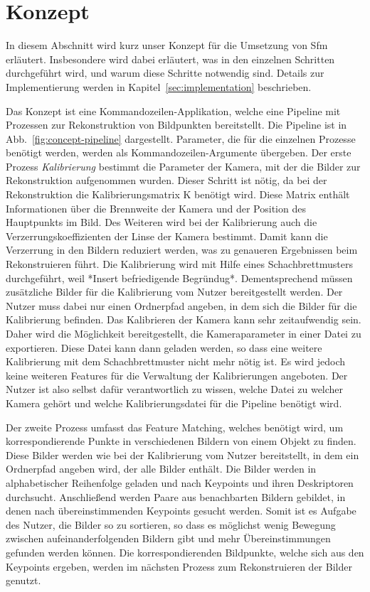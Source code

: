 
\chapter{Konzept}
In diesem Abschnitt wird kurz unser Konzept für die Umsetzung von Sfm erläutert. 
Insbesondere wird dabei erläutert, was in den einzelnen Schritten durchgeführt wird, und warum diese Schritte notwendig sind.
Details zur Implementierung werden in Kapitel~\ref{sec:implementation} beschrieben.

Das Konzept ist eine Kommandozeilen-Applikation, welche eine Pipeline mit Prozessen zur Rekonstruktion von Bildpunkten bereitstellt.
Die Pipeline ist in Abb.~\ref{fig:concept-pipeline} dargestellt.
Parameter, die für die einzelnen Prozesse benötigt werden, werden als Kommandozeilen-Argumente übergeben.
Der erste Prozess \emph{Kalibrierung} bestimmt die Parameter der Kamera, mit der die Bilder zur Rekonstruktion aufgenommen wurden.
Dieser Schritt ist nötig, da bei der Rekonstruktion die Kalibrierungsmatrix K benötigt wird.
Diese Matrix enthält Informationen über die Brennweite der Kamera und der Position des Hauptpunkts im Bild.
Des Weiteren wird bei der Kalibrierung auch die Verzerrungskoeffizienten der Linse der Kamera bestimmt. %
Damit kann die Verzerrung in den Bildern reduziert werden, was zu genaueren Ergebnissen beim Rekonstruieren führt.%
Die Kalibrierung wird mit Hilfe eines Schachbrettmusters durchgeführt, weil *Insert befriedigende Begründug*.
Dementsprechend müssen zusätzliche Bilder für die Kalibrierung vom Nutzer bereitgestellt werden.
Der Nutzer muss dabei nur einen Ordnerpfad angeben, in dem sich die Bilder für die Kalibrierung befinden.
Das Kalibrieren der Kamera kann sehr zeitaufwendig sein.
Daher wird die Möglichkeit bereitgestellt, die Kameraparameter in einer Datei zu exportieren.
Diese Datei kann dann geladen werden, so dass eine weitere Kalibrierung mit dem Schachbrettmuster nicht mehr nötig ist. 
Es wird jedoch keine weiteren Features für die Verwaltung der Kalibrierungen angeboten.
Der Nutzer ist also selbst dafür verantwortlich zu wissen, welche Datei zu welcher Kamera gehört und welche Kalibrierungsdatei für die Pipeline benötigt wird. 

Der zweite Prozess umfasst das Feature Matching, welches benötigt wird, um korrespondierende Punkte in verschiedenen Bildern von einem Objekt zu finden.
Diese Bilder werden wie bei der Kalibrierung vom Nutzer bereitstellt, in dem ein Ordnerpfad angeben wird, der alle Bilder enthält. 
Die Bilder werden in alphabetischer Reihenfolge geladen und nach Keypoints und ihren Deskriptoren durchsucht.
Anschließend werden Paare aus benachbarten Bildern gebildet, in denen nach übereinstimmenden Keypoints gesucht werden.
Somit ist es Aufgabe des Nutzer, die Bilder so zu sortieren, so dass es möglichst wenig Bewegung zwischen aufeinanderfolgenden Bildern gibt und mehr Übereinstimmungen gefunden werden können.
Die korrespondierenden Bildpunkte, welche sich aus den Keypoints ergeben, werden im nächsten Prozess zum Rekonstruieren der Bilder genutzt.  

